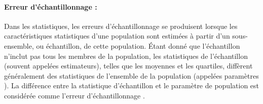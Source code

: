 \paragraph*{Erreur d'échantillonnage :}
Dans les statistiques, les erreurs d'échantillonnage se produisent lorsque les caractéristiques statistiques d'une population sont estimées à partir d'un sous-ensemble, ou échantillon, de cette population. Étant donné que l'échantillon n'inclut pas tous les membres de la population, les statistiques de l'échantillon (souvent appelées estimateurs), telles que les moyennes et les quartiles, diffèrent généralement des statistiques de l'ensemble de la population (appelées paramètres ). La différence entre la statistique d'échantillon et le paramètre de population est considérée comme l'erreur d'échantillonnage \cite{sarndal2003model}. 









